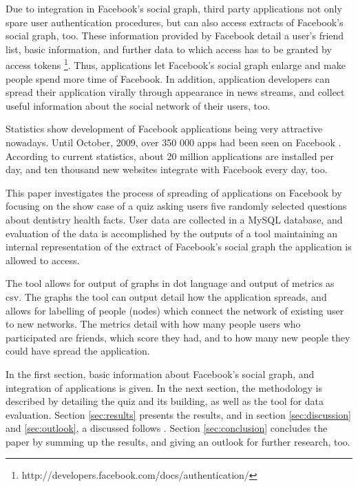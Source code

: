 \documentclass[preprint,12pt]{elsarticle}
\begin{document}
Due to integration in Facebook's social graph, third party
applications not only spare user authentication procedures, but can also access
extracts of Facebook's social graph, too. These information provided
by Facebook detail a user's friend list, basic information, and
further data to which access has to be granted by access tokens
\footnote{http://developers.facebook.com/docs/authentication/}. Thus,
applications let Facebook's social graph enlarge and make people
spend more time of Facebook. In addition, application developers
can spread their application virally through appearance in news
streams, and collect useful information about the social network of
their users, too.

Statistics show development of Facebook applications being very
attractive nowadays. Until October, 2009, 
over 350 000 apps had been seen on Facebook \cite{facebookBlog}.
According to current statistics, about 20 million applications are
installed per day, and ten thousand new websites integrate with
Facebook every day, too. \cite{facebookStats} 

This paper investigates the process of spreading of applications on
Facebook by focusing on the show case of a quiz asking users five randomly
selected questions about dentistry health facts. User data are
collected in a MySQL database, and evaluation of the data is
accomplished by the outputs of a tool maintaining an internal representation of the extract of Facebook's
social graph the application is allowed to access.

The tool allows for output of graphs in \ac{dot} language and output of
metrics as \ac{csv}. The graphs the tool can output detail how the application
spreads, and allows for labelling of people (nodes) which connect the
network of existing user to new networks. The metrics detail with how
many people users who participated are friends, which score they had,
and to how many new people they could have spread the application.

In the first section, basic information about Facebook's social graph,
and integration of applications is
given. In the next section, the methodology is described by detailing
the quiz and its building, as well as the tool for data evaluation. Section
\ref{sec:results} presents the results, and in section
\ref{sec:discussion} and \ref{sec:outlook}, a discussed follows . Section
\ref{sec:conclusion} concludes the paper by summing up the results,
and giving an outlook for further research, too.
\end{document}
